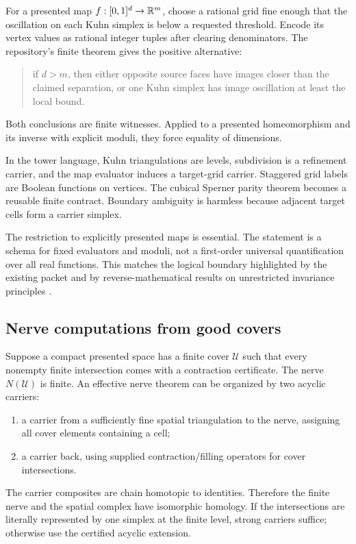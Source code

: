 For a presented map $f:[0,1]^d\to\mathbb{R}^m$, choose a rational grid fine enough that the oscillation on each Kuhn simplex is below a requested threshold.  Encode its vertex values as rational integer tuples after clearing denominators.  The repository's finite theorem gives the positive alternative:
\begin{quote}
if $d>m$, then either opposite source faces have images closer than the claimed separation, or one Kuhn simplex has image oscillation at least the local bound.
\end{quote}
Both conclusions are finite witnesses.  Applied to a presented homeomorphism and its inverse with explicit moduli, they force equality of dimensions.

In the tower language, Kuhn triangulations are levels, subdivision is a refinement carrier, and the map evaluator induces a target-grid carrier.  Staggered grid labels are Boolean functions on vertices.  The cubical Sperner parity theorem becomes a reusable finite contract.  Boundary ambiguity is harmless because adjacent target cells form a carrier simplex.

The restriction to explicitly presented maps is essential.  The statement is a schema for fixed evaluators and moduli, not a first-order universal quantification over all real functions.  This matches the logical boundary highlighted by the existing packet and by reverse-mathematical results on unrestricted invariance principles \cite{Kihara2020}.

\subsection{Nerve computations from good covers}

Suppose a compact presented space has a finite cover $\mathcal U$ such that every nonempty finite intersection comes with a contraction certificate.  The nerve $N(\mathcal U)$ is finite.  An effective nerve theorem can be organized by two acyclic carriers:
\begin{enumerate}
  \item a carrier from a sufficiently fine spatial triangulation to the nerve, assigning all cover elements containing a cell;
  \item a carrier back, using supplied contraction/filling operators for cover intersections.
\end{enumerate}
The carrier composites are chain homotopic to identities.  Therefore the finite nerve and the spatial complex have isomorphic homology.  If the intersections are literally represented by one simplex at the finite level, strong carriers suffice; otherwise use the certified acyclic extension.

